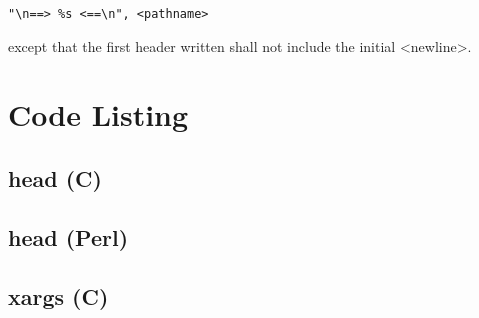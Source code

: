 \documentclass[en, listings]{labreport}
\begin{document}
\begin{verbatim}
"\n==> %s <==\n", <pathname>
\end{verbatim}

\noindent
except that the first header written shall not include the initial <newline>.

\section*{Code Listing}

\subsection*{head (C)}

\setmonofont{Fira Mono}


\subsection*{head (Perl)}



\subsection*{xargs (C)}


\end{document}
